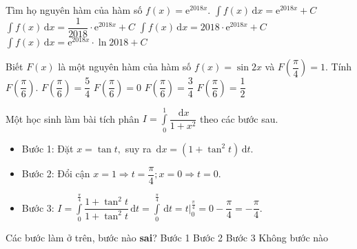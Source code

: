 \begin{ex}%
Tìm họ nguyên hàm của hàm số $f(x)=\mathrm{e}^{2018x}.$
\choice
{$\displaystyle\int f(x)\mathrm{\,d}x=\mathrm{e}^{2018x}+C$}
{\True $\displaystyle\int f(x)\mathrm{\,d}x=\dfrac{1}{2018}\cdot   \mathrm{e}^{2018x}+C$}
{$\displaystyle\int f(x)\mathrm{\,d}x=2018\cdot \mathrm{e}^{2018x}+C$}
{$\displaystyle\int f(x)\mathrm{\,d}x=\mathrm{e}^{2018x}\cdot \ln{2018}+C$}
\end{ex}
\begin{ex}%
Biết $F(x)$ là một nguyên hàm của hàm số $f(x)=\sin 2x$ và $F\left(\dfrac{\pi}{4}\right)=1.$ Tính $F\left(\dfrac{\pi}{6}\right).$
\choice
{$F\left(\dfrac{\pi}{6}\right)=\dfrac{5}{4}$}
{$F\left(\dfrac{\pi}{6}\right)=0$}
{\True $F\left(\dfrac{\pi}{6}\right)=\dfrac{3}{4}$}
{$F\left(\dfrac{\pi}{6}\right)=\dfrac{1}{2}$}
\end{ex}
\begin{ex}%
Một học sinh làm bài tích phân $I=\displaystyle\int\limits_0^1\dfrac{\mathrm{\,d}x}{1+x^2}$ theo các bước sau.
\begin{itemize}
\item Bước 1: Đặt $x=\tan t,$  suy ra $ \mathrm{\, d}x=(1+\tan^2 t)\mathrm{\,d}t.$
\item Bước 2: Đổi cận $x=1\Rightarrow t=\dfrac{\pi}{4};   x=0\Rightarrow t=0.$
\item Bước 3: $I=\displaystyle\int\limits_0^{\frac{\pi}{4}}\dfrac{1+\tan^2 t}{1+\tan^2 t}\mathrm{\,d}t=\displaystyle\int\limits_0^{\frac{\pi}{4}}\mathrm{\,d}t=t\Big |_0^{\tfrac{\pi}{4}}=0-\dfrac{\pi}{4}=-\dfrac{\pi}{4}.$
\end{itemize}
Các bước làm ở trên, bước nào \textbf{sai}?
\choice
{Bước 1}
{Bước 2}
{\True Bước 3}
{Không bước nào}
\end{ex}
